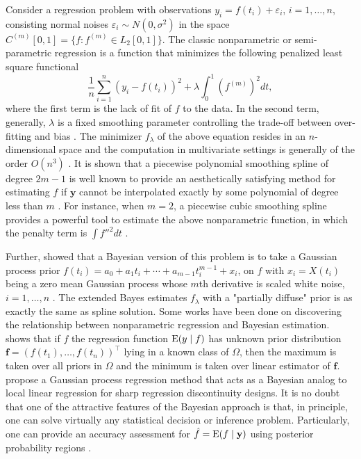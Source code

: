 Consider a regression problem with observations $y_i = f(t_i)+\varepsilon_i$, $i=1,\ldots,n$, consisting \iid normal noises $\varepsilon_i\sim N(0,\sigma^2)$ in the space $C^{(m)}[0,1]=\{ f:f^{(m)}\in \mathit{L}_2[0,1] \}$. The classic nonparametric or semi-parametric regression is a function that minimizes the following penalized least square functional 
\begin{equation}\label{GaussianProcessGeneralObjective}
\frac{1}{n}\sum_{i=1}^{n}\left( y_i-f(t_i) \right)^2 + \lambda \int_{0}^{1} \left( f^{(m)}\right)^2dt, 
\end{equation}
where the first term is the lack of fit of $f$ to the data. In the second term, generally, $\lambda$ is a fixed smoothing parameter controlling the trade-off between over-fitting and bias \cite{esl2009}. The minimizer $f_\lambda$ of the above equation resides in an $n$-dimensional space and the computation in multivariate settings is generally of the order $O(n^3)$ \cite{kim2004smoothing}. It is shown that a piecewise polynomial smoothing spline of degree $2m-1$ is well known to provide an aesthetically satisfying method for estimating $f$ if $\mathbf{y}$ cannot be interpolated exactly by some polynomial of degree less than $m$ \cite{schoenberg1964spline}. For instance, when $m=2$, a piecewise cubic smoothing spline provides a powerful tool to estimate the above nonparametric function, in which the penalty term is $\int f''^2dt$ \cite{hastie1990generalized}. 



Further, \cite{wahba1978improper} showed that a Bayesian version of this problem is to take a Gaussian process prior $f(t_i) = a_0+a_1t_i+\cdots + a_{m-1}t_i^{m-1} + x_i$, on $f$ with $x_i=X(t_i)$ being a zero mean Gaussian process whose $m$th derivative is scaled white noise, $i=1,\ldots,n$ \cite{speckman2003fully}. The extended Bayes estimates $f_\lambda$ with a "partially diffuse" prior is as exactly the same as spline solution. Some works have been done on discovering the relationship between nonparametric regression and Bayesian estimation. \cite{heckman1991minimax} shows that if $f$ the regression function $\mathrm{E}(y\mid f)$ has unknown prior distribution  $\mathbf{f}=(f(t_1),\ldots,f(t_n))^\top$ lying in a known class of $\Omega$, then the maximum is taken over all priors in $\Omega$ and the minimum is taken over linear estimator of $\mathbf{f}$. \cite{branson2017nonparametric} propose a Gaussian process regression method that acts as a Bayesian analog to local linear regression for sharp regression discontinuity designs. It is no doubt that one of the attractive features of the Bayesian approach is that, in principle, one can solve virtually any statistical decision or inference problem. Particularly, one can provide an accuracy assessment for $\hat{f}=\mathrm{E} (f\mid \mathbf{y})$ using posterior probability regions \cite{cox1993analysis}. 


